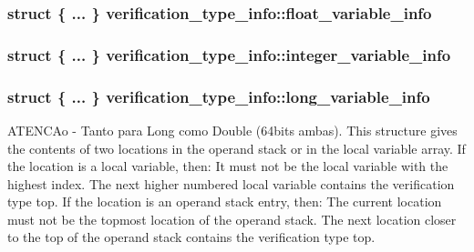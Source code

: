 \subsubsection[{\texorpdfstring{float\+\_\+variable\+\_\+info}{float_variable_info}}]{\setlength{\rightskip}{0pt plus 5cm}struct \{ ... \}   verification\+\_\+type\+\_\+info\+::float\+\_\+variable\+\_\+info}\hypertarget{structverification__type__info_a21e1445357184dfacb843c0e9d75c5a3}{}\label{structverification__type__info_a21e1445357184dfacb843c0e9d75c5a3}
\subsubsection[{\texorpdfstring{integer\+\_\+variable\+\_\+info}{integer_variable_info}}]{\setlength{\rightskip}{0pt plus 5cm}struct \{ ... \}   verification\+\_\+type\+\_\+info\+::integer\+\_\+variable\+\_\+info}\hypertarget{structverification__type__info_a518dcb2dd60e556d8ea4059f6a6dd3b1}{}\label{structverification__type__info_a518dcb2dd60e556d8ea4059f6a6dd3b1}
\subsubsection[{\texorpdfstring{long\+\_\+variable\+\_\+info}{long_variable_info}}]{\setlength{\rightskip}{0pt plus 5cm}struct \{ ... \}   verification\+\_\+type\+\_\+info\+::long\+\_\+variable\+\_\+info}\hypertarget{structverification__type__info_ae205fc70c729fd4a92d31af0becd819d}{}\label{structverification__type__info_ae205fc70c729fd4a92d31af0becd819d}
A\+T\+E\+N\+C\+Ao -\/ Tanto para Long como Double (64bits ambas). This structure gives the contents of two locations in the operand stack or in the local variable array. If the location is a local variable, then\+: It must not be the local variable with the highest index. The next higher numbered local variable contains the verification type top. If the location is an operand stack entry, then\+: The current location must not be the topmost location of the operand stack. The next location closer to the top of the operand stack contains the verification type top. 
